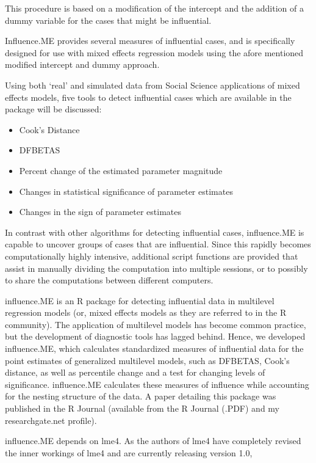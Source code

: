 \documentclass[12pt, a4paper]{article}
\begin{document}
This procedure is
based on a modification of the intercept and the addition of a dummy variable for the cases that might be
influential. 

Influence.ME provides several measures of influential cases, and is specifically designed for use
with mixed effects regression models using the afore mentioned modified intercept and dummy approach.

Using both ‘real’ and simulated data from Social Science applications of mixed effects models, five tools to
detect influential cases which are available in the package will be discussed:
\begin{itemize}
	\item Cook’s Distance
	\item DFBETAS
	\item Percent change of the estimated parameter magnitude
	\item Changes in statistical significance of parameter estimates
	\item Changes in the sign of parameter estimates
\end{itemize}
In contrast with other algorithms for detecting influential cases, influence.ME is capable to uncover
groups of cases that are influential. Since this rapidly becomes computationally highly intensive, additional
script functions are provided that assist in manually dividing the computation into multiple sessions, or to
possibly to share the computations between different computers.


influence.ME is an R package for detecting influential data in multilevel regression models (or, mixed effects models as they are referred to in the R community). The application of multilevel models has become common practice, but the development of diagnostic tools has lagged behind. Hence, we developed influence.ME, which calculates standardized measures of influential data for the point estimates of generalized multilevel models, such as DFBETAS, Cook’s distance, as well as percentile change and a test for changing levels of significance. influence.ME calculates these measures of influence while accounting for the nesting structure of the data. A paper detailing this package was published in the R Journal (available from the R Journal (.PDF) and my researchgate.net profile).

influence.ME depends on lme4. As the authors of lme4 have completely revised the inner workings of lme4 and are currently releasing version 1.0, 
\end{document}
